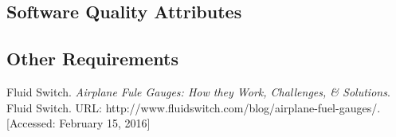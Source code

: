 \documentclass[10pt, a4paper, onecolumn]{scrartcl}
\begin{document}
		\subsection{Software Quality Attributes}
		
		\subsection{Other Requirements}
	
	\begin{thebibliography}{99}
		Fluid Switch. \textit{Airplane Fule Gauges: How they Work, Challenges, \& Solutions}. Fluid Switch. URL: http://www.fluidswitch.com/blog/airplane-fuel-gauges/. [Accessed: February 15, 2016]
	\end{thebibliography}
	
	
	
	
	
\end{document}
